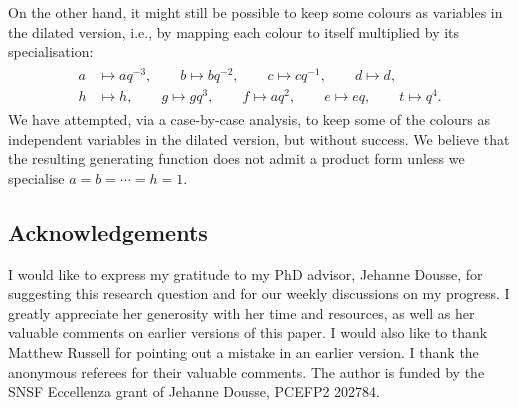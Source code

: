 \documentclass[10pt,a4paper]{amsart}
\numberwithin{equation}{section}
\theoremstyle{definition}
\begin{document}
On the other hand, it might still be possible to keep some colours as variables in the dilated version, i.e., by mapping each colour to itself multiplied by its specialisation:
\begin{align*}
\begin{aligned}
 a &\mapsto aq^{-3}, \qquad b \mapsto bq^{-2}, \qquad c \mapsto cq^{-1}, \qquad d \mapsto d, \\
 h &\mapsto h, \qquad g \mapsto gq^{3}, \qquad f \mapsto aq^{2}, \qquad e \mapsto eq, \qquad t \mapsto q^{4}.
\end{aligned}
\end{align*}
We have attempted, via a case-by-case analysis, to keep some of the colours as independent variables in the dilated version, but without success. We believe that the resulting generating function does not admit a product form unless we specialise $a=b=\cdots=h=1$.


\subsection*{Acknowledgements}

I would like to express my gratitude to my PhD advisor, Jehanne Dousse, for suggesting this research question and for our weekly discussions on my progress. I greatly appreciate her generosity with her time and resources, as well as her valuable comments on earlier versions of this paper. I would also like to thank Matthew Russell for pointing out a mistake in an earlier version. I thank the anonymous referees for their valuable comments. The author is funded by the SNSF
Eccellenza grant of Jehanne Dousse, PCEFP2 202784.

\end{document}

